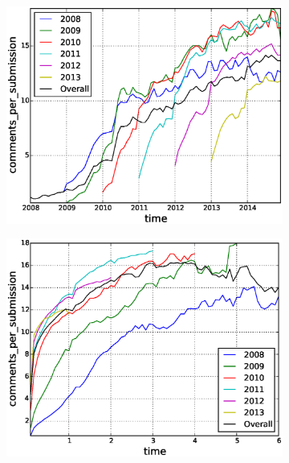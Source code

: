 \begin{figure}[!tb]
\centering
\begin{subfigure}{.49\textwidth}\includegraphics[scale=0.4]{./images/comments_per_submissions_over_time_cohorts.eps}\caption{}\end{subfigure}
\begin{subfigure}{.49\textwidth}\includegraphics[scale=0.4]{./images/comments_per_submissions_cohorts.eps}\caption{}\end{subfigure}
\begin{subfigure}{1\textwidth}

\end{subfigure}
\end{figure}
